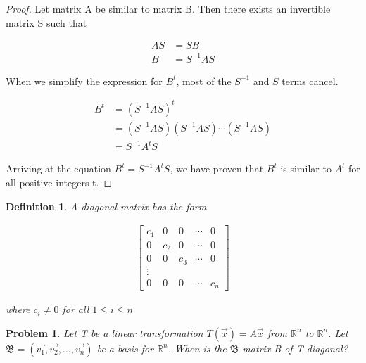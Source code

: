 \documentclass{article}
\newtheorem{definition}{Definition}
\newtheorem{problem}{Problem}
\begin{document}
\begin{proof}
Let matrix A be similar to matrix B. Then there exists an invertible matrix S such that 

\begin{align*}
AS &= SB \\
B &= S^{-1}AS
\end{align*}

When we simplify the expression for $B^{t}$, most of the $S^{-1}$ and $S$ terms cancel.

\begin{align*}
B^{t} &= (S^{-1}AS)^{t} \\
&= (S^{-1}AS)(S^{-1}AS)\cdots(S^{-1}AS) \\
&= S^{-1}A^{t}S
\end{align*}

Arriving at the equation $B^{t} = S^{-1}A^{t}S$, we have proven that $B^{t}$ is similar to $A^{t}$ for all positive integers t.

\end{proof}

\begin{definition}
A diagonal matrix has the form

\begin{align*}
\begin{bmatrix}
c_{1} & 0 & 0 & \cdots & 0 \\
0 & c_{2} & 0 & \cdots & 0 \\
0 & 0 & c_{3} & \cdots & 0 \\
\vdots \\
0 & 0 & 0 & \cdots & c_{n}
\end{bmatrix}
\end{align*}

where $c_{i} \neq 0$ for all $1 \leq i \leq n$
\end{definition}

\begin{problem}
Let T be a linear transformation $T(\vec{x}) = A\vec{x}$ from $\mathbb{R}^n$ to $\mathbb{R}^n$. Let $\mathfrak{B} = (\vec{v_{1}}, \vec{v_{2}}, \ldots, \vec{v_{n}})$ be a basis for $\mathbb{R}^n$. When is the $\mathfrak{B}$-matrix B of T diagonal?
\end{problem}
\end{document}
